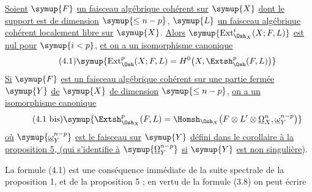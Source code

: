  \uline{Soient} $\symup{F}$ \uline{un faisceau algébrique cohérent sur} $\symup{X}$ \uline{dont le
support est de dimension} $\symup{\leq n-p}$, $\symup{L}$ \uline{un faisceau algébrique cohérent
localement libre sur} $\symup{X}$. \uline{Alors} $\symup{\operatorname{Ext}_{\Osh_X}^{i}(X;F,L)}$ \uline{est nul
pour} $\symup{i<p}$, \uline{et on a un isomorphisme canonique}
\begin{equation}\tag{4.1}
  \symup{\operatorname{Ext}_{\Osh}^{p}(X;F,L)
  =H^{0}\bigl(X,\Extsh_{\Osh}^{p}(F,L)\bigr)}
\end{equation}
\uline{Si} $\symup{F}$ \uline{est un faisceau algébrique cohérent sur une partie fermée} $\symup{Y}$ \uline{de} $\symup{X}$ \uline{de
dimension} $\symup{\leq n-p}$, \uline{on a un isomorphisme canonique}
\begin{equation}\tag{4.1 bis}
  \symup{\Extsh_{\Osh_X}^{p}(F,L)
  =\Homsh_{\Osh_X}\!\left(
    F\otimes L'\otimes\underline{\Omega}_X^{n},\underline{\omega}_Y^{n-p}
  \right)}
\end{equation}
\uline{où} $\symup{\underline{\omega}_Y^{n-p}}$ \uline{est le faisceau sur} $\symup{Y}$ \uline{défini dans le corollaire à la
proposition 5, (qui s'identifie à} $\symup{\underline{\Omega}_Y^{n-p}}$ \uline{si} $\symup{Y}$ \uline{est non singulière}).

La formule (4.1) est une conséquence immédiate de la suite spectrale de la
proposition 1, et de la proposition 5 ; en vertu de la formule (3.8) on peut
écrire


